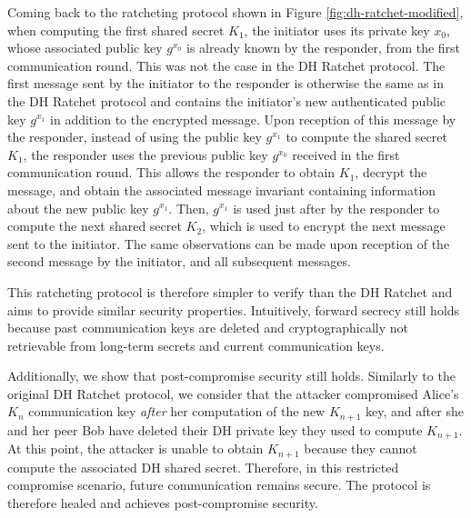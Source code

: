 Coming back to the ratcheting protocol shown in Figure \ref{fig:dh-ratchet-modified}, when computing the first shared secret $K_1$, the initiator uses its private key $x_0$, whose associated public key $g^{x_0}$ is already known by the responder, from the first communication round.
This was not the case in the DH Ratchet protocol.
The first message sent by the initiator to the responder is otherwise the same as in the DH Ratchet protocol and contains the initiator's new authenticated public key $g^{x_1}$ in addition to the encrypted message.
Upon reception of this message by the responder, instead of using the public key $g^{x_1}$ to compute the shared secret $K_1$, the responder uses the previous public key $g^{x_0}$ received in the first communication round.
This allows the responder to obtain $K_1$, decrypt the message, and obtain the associated message invariant containing information about the new public key $g^{x_1}$.
Then, $g^{x_1}$ is used just after by the responder to compute the next shared secret $K_2$, which is used to encrypt the next message sent to the initiator.
The same observations can be made upon reception of the second message by the initiator, and all subsequent messages. 

This ratcheting protocol is therefore simpler to verify than the DH Ratchet and aims to provide similar security properties.
Intuitively, forward secrecy still holds because past communication keys are deleted and cryptographically not retrievable from long-term secrets and current communication keys.

Additionally, we show that post-compromise security still holds.
Similarly to the original DH Ratchet protocol, we consider that the attacker compromised Alice's $K_n$ communication key \emph{after} her computation of the new $K_{n+1}$ key, and after she and her peer Bob have deleted their DH private key they used to compute $K_{n+1}$.
At this point, the attacker is unable to obtain $K_{n+1}$ because they cannot compute the associated DH shared secret.
Therefore, in this restricted compromise scenario, future communication remains secure.
The protocol is therefore healed and achieves post-compromise security.

